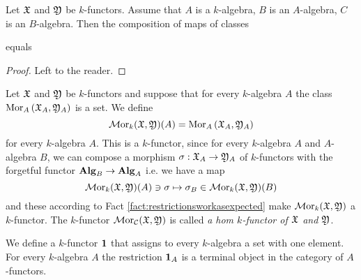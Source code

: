 \begin{fact}\label{fact:restrictionsworkasexpected}
Let ${\mathfrak X}$ and ${\mathfrak Y}$ be $k$-functors. Assume that $A$ is a $k$-algebra, $B$ is an $A$-algebra, $C$ is an $B$-algebra. Then the composition of maps of classes
\begin{center}
\end{center}
equals
\begin{center}
\end{center}
\end{fact}
\begin{proof}
Left to the reader.
\end{proof}

\begin{definition}
Let ${\mathfrak X}$ and ${\mathfrak Y}$ be $k$-functors and suppose that for every $k$-algebra $A$ the class $\mathrm{Mor}_A\left({\mathfrak X}_A,{\mathfrak Y}_A\right)$ is a set. We define
$$\mathcal{M}\mathrm{or}_k({\mathfrak X},{\mathfrak Y})(A)=\mathrm{Mor}_A\left({\mathfrak X}_A,{\mathfrak Y}_A\right)$$
for every $k$-algebra $A$. This is a $k$-functor, since for every $k$-algebra $A$ and $A$-algebra $B$, we can compose a morphism $\sigma:{\mathfrak X}_A\rightarrow {\mathfrak Y}_A$ of $k$-functors with the forgetful functor $\mathbf{Alg}_B \rightarrow \mathbf{Alg}_A$ i.e. we have a map 
$$\mathcal{M}\mathrm{or}_{k}({\mathfrak X},{\mathfrak Y})(A)\ni \sigma \mapsto \sigma_{B}\in \mathcal{M}\mathrm{or}_{k}({\mathfrak X},{\mathfrak Y})(B)$$
and these according to Fact \ref{fact:restrictionsworkasexpected} make $\mathcal{M}\mathrm{or}_{k}({\mathfrak X},{\mathfrak Y})$ a $k$-functor. The $k$-functor $\mathcal{M}\mathrm{or}_{{\mathcal C}}({\mathfrak X},{\mathfrak Y})$ is called \textit{a hom $k$-functor of ${\mathfrak X}$ and ${\mathfrak Y}$}.
\end{definition}
\noindent
We define a $k$-functor $\mathbf{1}$ that assigns to every $k$-algebra a set with one element. For every $k$-algebra $A$ the restriction $\mathbf{1}_A$ is a terminal object in the category of $A$-functors.

